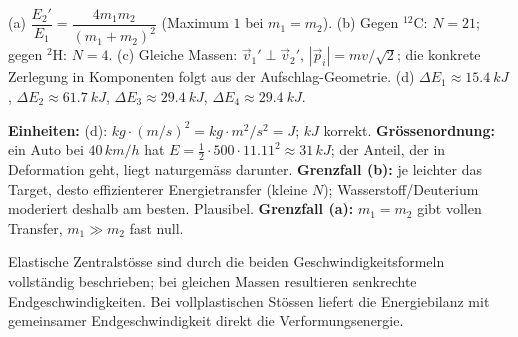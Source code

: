 \begin{ergebnis}
(a) $\dfrac{E_2'}{E_1}=\dfrac{4m_1m_2}{(m_1+m_2)^2}$ (Maximum $1$ bei $m_1=m_2$).
(b) Gegen $^{12}\mathrm C$: $N=21$; gegen $^{2}\mathrm H$: $N=4$.
(c) Gleiche Massen: $\vec v_1'\perp\vec v_2'$, $|\vec p_i|=mv/\sqrt2$;
die konkrete Zerlegung in Komponenten folgt aus der Aufschlag-Geometrie.
(d) $\Delta E_1\approx\qty{15.4}{kJ}$, $\Delta E_2\approx\qty{61.7}{kJ}$,
$\Delta E_3\approx\qty{29.4}{kJ}$, $\Delta E_4\approx\qty{29.4}{kJ}$.
\end{ergebnis}

\begin{kontrolle}
\textbf{Einheiten:} (d): $kg\cdot (m/s)^2 = kg\cdot m^2/s^2 = J$; $kJ$ korrekt.
\textbf{Grössenordnung:} ein Auto bei $40\,\unit{km/h}$ hat $E=\frac12\cdot500\cdot11.11^2\approx
31\,\unit{kJ}$; der Anteil, der in Deformation geht, liegt naturgemäss darunter.
\textbf{Grenzfall (b):} je leichter das Target, desto effizienterer Energietransfer
(kleine $N$); Wasserstoff/Deuterium moderiert deshalb am besten. Plausibel.
\textbf{Grenzfall (a):} $m_1=m_2$ gibt vollen Transfer, $m_1\gg m_2$ fast null.
\end{kontrolle}

\begin{merksatz}
Elastische Zentralstösse sind durch die beiden Geschwindigkeitsformeln
vollständig beschrieben; bei gleichen Massen resultieren senkrechte
Endgeschwindigkeiten. Bei vollplastischen Stössen liefert die Energiebilanz
mit gemeinsamer Endgeschwindigkeit direkt die Verformungsenergie.
\end{merksatz}
